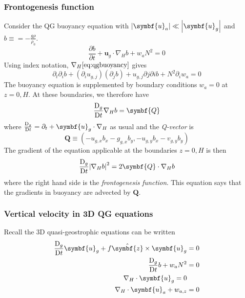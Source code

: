 \documentclass{jknotes}
\begin{document}
\subsubsection{Frontogenesis function}
Consider the QG buoyancy equation with $\abs{\symbf{u}_a} \ll
\abs{\symbf{u}_g}$ and $b \equiv = -\frac{g\rho}{\rho_0}$.
\begin{equation}
	\frac{\partial b}{\partial t} + \symbf{u}_g \cdot \nabla_H b + w_a N^2 = 0
	\label{eq:qgbuoyancy}
\end{equation}
Using index notation, $\nabla_H \eqref{eq:qgbuoyancy}$ gives
\begin{equation}
	\partial_t \partial_i b + (\partial_i u_{g,j})(\partial_j b) +
	u_{g,j}\partial j \partial i b + N^2 \partial_i w_a = 0
\end{equation}
The buoyancy equation is supplemented by boundary conditions $w_a = 0$ at
$z=0, H$. At these boundaries, we therefore have
\begin{equation}
	\frac{\diffD_g}{\diffD t} \nabla_H b = \symbf{Q}
\end{equation}
where $\frac{\diffD_g}{\diffD t} = \partial_t + \symbf{u}_g \cdot \nabla_H$ as
usual and the \emph{Q-vector} is
\begin{equation}
	\symbf{Q} \equiv (-u_{g,x} b_x - g_{g,x} b_y, -u_{g,y} b_x - v_{g,y}b_y)
\end{equation}
The gradient of the equation applicable at the boundaries $z=0,H$ is then
\begin{equation}
	\frac{\diffD_g}{\diffD t} \abs{\nabla_H b}^2 = 2\symbf{Q}\cdot\nabla_H b
	\label{eq:frontogenesis}
\end{equation}
where the right hand side is the \emph{frontogenesis function}. This equation
says that the gradients in buoyancy are advected by $\symbf{Q}$.

\subsubsection{Vertical velocity in 3D QG equations}
Recall the 3D quasi-geostrophic equations can be written
\begin{align}
	\frac{\diffD_g}{\diffD t} \symbf{u}_g + f \hat{\symbf{z}}\times
	\symbf{u}_g &= 0 \label{eq:3dqg.1} \\
	\frac{\diffD_g}{\diffD t} b + w_a N^2 &= 0 \label{eq:3dqg.2} \\
	\nabla_H \cdot \symbf{u}_g = 0 \label{eq:3dqg.3} \\
	\nabla_H \cdot \symbf{u}_a + w_{a,z} &= 0 \label{eq:3dqg.4}
\end{align}
\end{document}
